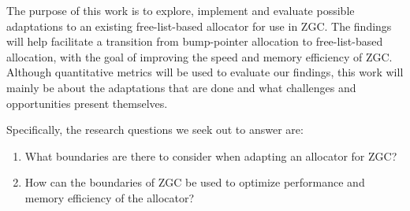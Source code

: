 
The purpose of this work is to explore, implement and evaluate possible adaptations to an existing free-list-based allocator for use in ZGC. The findings will help facilitate a transition from bump-pointer allocation to free-list-based allocation, with the goal of improving the speed and memory efficiency of ZGC. Although quantitative metrics will be used to evaluate our findings, this work will mainly be about the adaptations that are done and what challenges and opportunities present themselves.

Specifically, the research questions we seek out to answer are:

\begin{enumerate}
    \item What boundaries are there to consider when adapting an allocator for ZGC?
    \item How can the boundaries of ZGC be used to optimize performance and memory efficiency of the allocator?
\end{enumerate}

